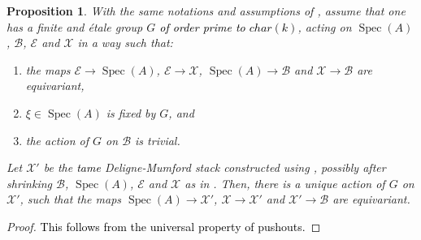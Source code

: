 \documentclass{amsart}
\newcommand{\cB}{\mathcal{B}}
\newcommand{\cE}{\mathcal{E}}
\newcommand{\cX}{\mathcal{X}}
\newcommand{\spec}{\operatorname{Spec}}
\newtheorem{Prop}[theorem]{Proposition}
\theoremstyle{definition}
\begin{document}
\begin{Prop}\label{prop_extending_action}
With the same notations and assumptions of , assume that one has a finite and \'etale group $G$ \textcolor{black}{of order prime to $char(k)$}, acting on $\spec(A)$, $\cB$, $\cE$ and $\cX$ in a way such that:
\begin{enumerate}
    \item the maps $\cE\to \spec(A)$, $\cE\to \cX$, $\spec(A)\to \cB$ and $\cX\to \cB$ are equivariant, 
    \item  $\xi\in \spec(A)$ is fixed by $G$, and
    \item the action of $G$ on $\cB$ is trivial.
\end{enumerate}
Let $\cX'$ be the \textcolor{black}{tame} Deligne-Mumford stack constructed using , possibly after shrinking $\cB$, $\spec(A)$, $\cE$ and $\cX$ as in .
Then, there is a unique action of $G$ on $\cX'$, such that the maps $\spec(A)\to \cX'$, $\cX\to \cX'$ and $\cX'\to \cB$ are equivariant.
\end{Prop}



\begin{proof}\textcolor{black}{This follows from the universal property of pushouts.}
\end{proof}
\end{document}
